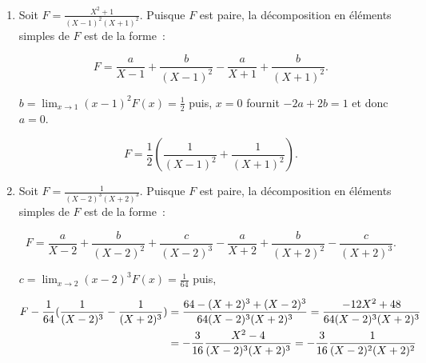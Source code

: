 {{\begin{enumerate}
$$F=\frac{a}{X}+\frac{b}{X-1}+\frac{c}{(X-1)^2},$$ avec 

$a=\lim_{x\rightarrow 0}xF(x)=1$ et $c=\lim_{x\rightarrow 1}(x-1)^2F(x)=1$. Enfin, $x=-1$ fournit $-1-\frac{b}{2}+\frac{1}{4}=-\frac{1}{4}$ et donc $b=-1$.

Pour trouver $b$, on peut aussi écrire (le meilleur) $0=\lim_{x\rightarrow +\infty}xF(x)=a+b$ et donc que $b=-a=-1$.

On peut encore écrire (le moins bon ici)

$$\frac{1}{X(X-1)^2}-\frac{1}{X}-\frac{1}{(X-1)^2}=\frac{1-(X-1)^2-X}{X(X-1)^2}=\frac{-X^2+X}{X(X-1)^2}
=-\frac{1}{X-1}.$$

Donc,

$$F=\frac{1}{X}-\frac{1}{X-1}+\frac{1}{(X-1)^2}.$$

Autre démarche.

\begin{align*}\ensuremath
\frac{1}{X(X-1)^2}&=\frac{X-1-X}{X(X-1)^2}=\frac{1}{X(X-1)}-\frac{1}{(X-1)^2}
=\frac{X-1-X}{X(X-1)}-\frac{1}{(X-1)^2}\\
 &=\frac{1}{X}-\frac{1}{X-1}+\frac{1}{(X-1)^2}.
\end{align*}

\item  Soit $F=\frac{X^2+1}{(X-1)^2(X+1)^2}$. Puisque $F$ est paire, la décomposition en éléments simples de $F$ est de la forme~:

$$F=\frac{a}{X-1}+\frac{b}{(X-1)^2}-\frac{a}{X+1}+\frac{b}{(X+1)^2}.$$

$b=\lim_{x\rightarrow 1}(x-1)^2F(x)=\frac{1}{2}$ puis, $x=0$ fournit $-2a+2b=1$ et donc $a=0$.
 
$$F=\frac{1}{2}(\frac{1}{(X-1)^2}+\frac{1}{(X+1)^2}).$$

\item  Soit $F=\frac{1}{(X-2)^3(X+2)^3}$. Puisque $F$ est paire, la décomposition en éléments simples de $F$ est de la forme~:

$$F=\frac{a}{X-2}+\frac{b}{(X-2)^2}+\frac{c}{(X-2)^3}-\frac{a}{X+2}+\frac{b}{(X+2)^2}-\frac{c}{(X+2)^3}.$$

$c=\lim_{x\rightarrow 2}(x-2)^3F(x)=\frac{1}{64}$ puis,

\begin{align*}\ensuremath
F-\frac{1}{64}(\frac{1}{(X-2)^3}-\frac{1}{(X+2)^3})&=\frac{64-(X+2)^3+(X-2)^3}{64(X-2)^3(X+2)^3}=
\frac{-12X^2+48}{64(X-2)^3(X+2)^3}\\
 &=-\frac{3}{16}\frac{X^2-4}{(X-2)^3(X+2)^3}=-\frac{3}{16}\frac{1}{(X-2)^2(X+2)^2}
\end{align*}


\end{enumerate}}}
